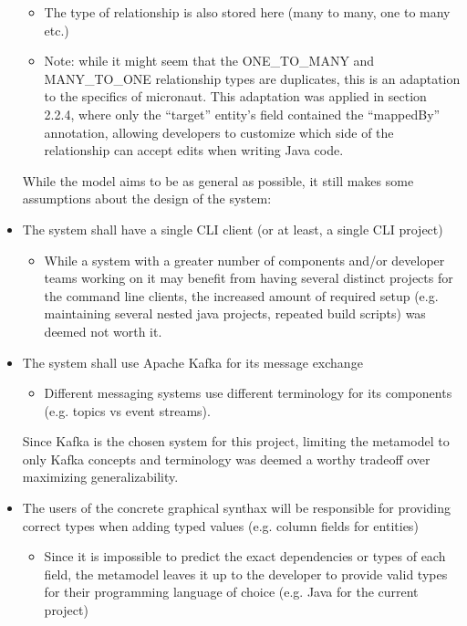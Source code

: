 \documentclass[parskip=full]{article}
\begin{document}
\begin{itemize}
\begin{itemize}
            \item The type of relationship is also stored here (many to many, one to many etc.)
            \item Note:  while it might seem that the ONE\_TO\_MANY and MANY\_TO\_ONE relationship types are duplicates, this is an adaptation to the specifics of micronaut.
            This adaptation was applied in section 2.2.4, where only the  ``target'' entity's field contained the  ``mappedBy'' annotation, allowing developers to customize which side of the relationship can accept edits when writing Java code.
        \end{itemize}
        While the model aims to be as general as possible, it still makes some assumptions about the design of the system:
        \item	The system shall have a single CLI client (or at least, a single CLI project)
        \begin{itemize}
            \item While a system with a greater number of components and/or developer teams working on it may benefit from having several distinct projects for the command line clients, the increased amount of required setup (e.g. maintaining several nested java projects, repeated build scripts) was deemed not worth it.
        \end{itemize}
        \item	The system shall use Apache Kafka for its message exchange
        \begin{itemize}
            \item Different messaging systems use different terminology for its components (e.g. topics vs event streams).
        \end{itemize}
        Since Kafka is the chosen system for this project, limiting the metamodel to only Kafka concepts and terminology was deemed a worthy tradeoff over maximizing generalizability.
        \item	The users of the concrete graphical synthax will be responsible for providing correct types when adding typed values (e.g. column fields for entities)
        \begin{itemize}
            \item Since it is impossible to predict the exact dependencies or types of each field, the metamodel leaves it up to the developer to provide valid types for their programming language of choice (e.g. Java for the current project)
        \end{itemize}

\end{itemize}
\end{document}
